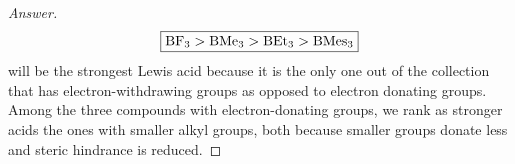 \documentclass[../psets.tex]{subfiles}
\begin{document}
\begin{enumerate}[label={\Roman*)}]
\begin{enumerate}[label={\textbf{6.\arabic*}}]
\begin{proof}[Answer]
\begin{equation*}
                \boxed{\ce{BF3} > \ce{BMe3} > \ce{BEt3} > \ce{BMes3}}
            \end{equation*}
             will be the strongest Lewis acid because it is the only one out of the collection that has electron-withdrawing groups as opposed to electron donating groups. Among the three compounds with electron-donating groups, we rank as stronger acids the ones with smaller alkyl groups, both because smaller groups donate less and steric hindrance is reduced.
        \end{proof}
    \end{enumerate}
\end{enumerate}
\end{document}

